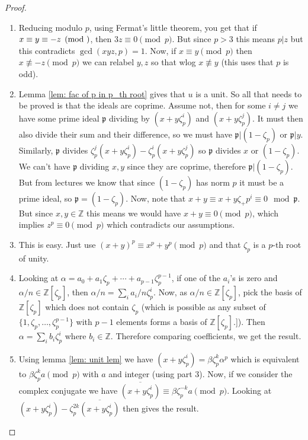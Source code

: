 \documentclass[11pt,a4paper]{amsart}
\theoremstyle{plain}
\theoremstyle{definition}
\theoremstyle{definition}
\newcommand{\ZZ}{\mathbb{Z}}
\def\gothp{\mathfrak{p}}
\def \a{\alpha}
\def \ov{\overline}
\begin{document}
	
	
	\begin{proof}
		
		\begin{enumerate}
			\item   Reducing modulo $p$, using Fermat's little theorem, you get that if $x \equiv y \equiv -z \pmod $, then $3z \equiv 0 \pmod p$. But since $p >3$ this means $p |z$ but this contradicts $\gcd(xyz,p)=1$. Now, if $x \equiv y \pmod p$ then  $x \not \equiv -z \pmod p$ we can relabel $y,z$ so that wlog $x \not \equiv y$ (this uses that $p$ is odd). 
			
			
			\item  Lemma \ref{lem: fac of p in p_th root} gives that $u$ is a unit. So all that needs to be proved is that the ideals are coprime. Assume not, then for some $i \neq j$ we have some prime ideal $\gothp$ dividing by $(x+y\zeta_p^i)$ and $(x+y\zeta_p^j)$. It must then also divide their sum and their difference, so we must have $\gothp | (1-\zeta_p)$ or $\gothp | y$. Similarly, $\gothp$ divides $\zeta_p^j(x+y\zeta_p^i)-\zeta_p^i(x+y\zeta_p^j)$ so $\gothp$ divides $x$ or $(1-\zeta_p)$. We can't have $\gothp$ dividing $x,y$ since they are coprime, therefore $\gothp |(1-\zeta_p)$. But from lectures we know that since $(1-\zeta_p)$ has norm $p$ it must be a prime ideal, so $\gothp=(1-\zeta_p)$. Now, note that $x+y \equiv x+y\zeta_+p^i \equiv 0 \mod \gothp$. But since $x,y \in \ZZ$ this means we would have $x+y \equiv 0 \pmod p$, which implies $z^p \equiv 0 \pmod p$ which contradicts our assumptions.
			
			\item This is easy. Just use $(x+y)^p \equiv x^p + y^p \pmod p$ and that $\zeta_p$ is a $p$-th root of unity.
			
			\item  Looking at $\a=a_0+a_1\zeta_p+\cdots+a_{p-1}\zeta_p^{p-1}$, if one of the $a_i$'s is zero and $\a/n \in \ZZ[\zeta_p]$, then $\a/n=\sum_i a_i/n \zeta_p^i$. Now, as $\a/n \in \ZZ[\zeta_p]$, pick the basis of $\ZZ[\zeta_p]$ which does not contain $\zeta_p$ (which is possible as any subset of $\{1,\zeta_p,\dots,\zeta_p^{p-1}\}$ with $p-1$ elements forms a basis of $\ZZ[\zeta_p]$.]). Then $\a=\sum_i b_i \zeta_p^i$ where $b_i \in \ZZ$. Therefore comparing coefficients, we get the result.
			
			\item  Using lemma \ref{lem: unit lem} we have $(x+y\zeta_p^i) =\beta \zeta_p^k \a^p$ which is equivalent to $\beta \zeta_p^k a \pmod p$ with $a$ and integer (using part $3$). Now, if we consider the complex conjugate we have $\ov{(x+y\zeta_p^i)  }\equiv \beta \zeta_p^{-k}a \pmod p$. Looking at $(x+y\zeta_p^i)-\zeta_p^{2k}\ov{(x+y\zeta_p^i)  }$ then gives the result.
			
			
			
			
		\end{enumerate}
		
	\end{proof}
	
\end{document}
